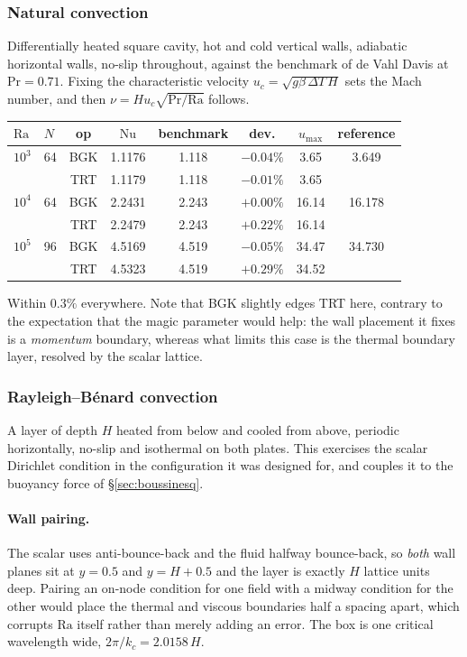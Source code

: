 \documentclass[11pt,a4paper]{article}
\begin{document}
\subsubsection{Natural convection}
\label{sec:natconv}

Differentially heated square cavity, hot and cold vertical walls, adiabatic
horizontal walls, no-slip throughout, against the benchmark of de Vahl Davis
\cite{devahldavis1983} at $\mathrm{Pr}=0.71$. Fixing the characteristic velocity
$u_c=\sqrt{g\beta\,\Delta T\,H}$ sets the Mach number, and then
$\nu = H u_c\sqrt{\mathrm{Pr}/\mathrm{Ra}}$ follows.

\begin{center}\small
\begin{tabular}{llcccccc}
\toprule
$\mathrm{Ra}$ & $N$ & op & $\mathrm{Nu}$ & benchmark & dev. & $u_{\max}$ & reference \\
\midrule
$10^3$ & 64 & BGK & 1.1176 & 1.118 & $-0.04\%$ & 3.65 & 3.649 \\
       &    & TRT & 1.1179 & 1.118 & $-0.01\%$ & 3.65 & \\
$10^4$ & 64 & BGK & 2.2431 & 2.243 & $+0.00\%$ & 16.14 & 16.178 \\
       &    & TRT & 2.2479 & 2.243 & $+0.22\%$ & 16.14 & \\
$10^5$ & 96 & BGK & 4.5169 & 4.519 & $-0.05\%$ & 34.47 & 34.730 \\
       &    & TRT & 4.5323 & 4.519 & $+0.29\%$ & 34.52 & \\
\bottomrule
\end{tabular}
\end{center}

\noindent Within $0.3\%$ everywhere. Note that BGK slightly edges TRT here,
contrary to the expectation that the magic parameter would help: the wall
placement it fixes is a \emph{momentum} boundary, whereas what limits this case is
the thermal boundary layer, resolved by the scalar lattice.
\subsubsection{Rayleigh--B\'enard convection}
\label{sec:rbconv}
\label{sec:rb}

A layer of depth $H$ heated from below and cooled from above, periodic
horizontally, no-slip and isothermal on both plates. This exercises the scalar
Dirichlet condition in the configuration it was designed for, and couples it to
the buoyancy force of \S\ref{sec:boussinesq}.

\paragraph{Wall pairing.} The scalar uses anti-bounce-back and the fluid halfway
bounce-back, so \emph{both} wall planes sit at $y=0.5$ and $y=H+0.5$ and the
layer is exactly $H$ lattice units deep. Pairing an on-node condition for one
field with a midway condition for the other would place the thermal and viscous
boundaries half a spacing apart, which corrupts $\mathrm{Ra}$ itself rather than
merely adding an error. The box is one critical wavelength wide,
$2\pi/k_c = 2.0158\,H$.
\end{document}
